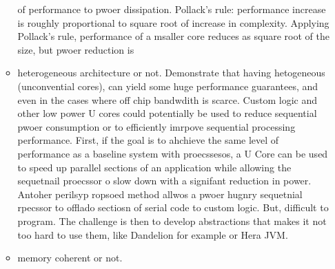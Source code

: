 \begin{itemize}
\begin{itemize}
of performance to pwoer dissipation. 
Pollack's rule: performance increase is roughly proportional to square root 
of increase in complexity. Applying Pollack's rule, 
performance of a msaller core reduces as square root of the size, but pwoer reduction is 
\item heterogeneous architecture or not. Demonstrate that having hetogeneous
(unconvential cores), can yield some huge performance guarantees, and 
even in the cases where off chip bandwdith is scarce. 
Custom logic and other low power U cores could potentially be used to
reduce sequential pwoer consumption or to efficiently 
imrpove sequential processing performance. First, if the goal is to ahchieve the same level of performance as a baseline system with proecssesos, a U Core can be used to speed up parallel sections of an application while allowing the sequetnail proecssor o slow down with a signifant reduction in power. Antoher perilsyp ropsoed method allwos a pwoer hugnry sequetnial rpecssor to offlado sectiosn of serial code to custom logic. 
But, difficult to program. The challenge is then to develop abstractions that makes it
not too hard to use them, like Dandelion for example or Hera JVM. 
\item memory coherent or not. 
\end{itemize}
\end{itemize}